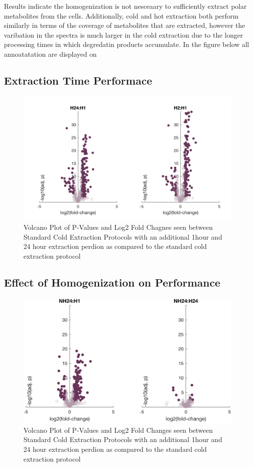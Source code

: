 \documentclass[a4paper]{article}
\begin{document}
Results indicate the homogenization is not nesceaary to sufficiently extract polar metabolites from the cells. Additionally, cold and hot extraction both perform similarly in terms of the coverage of metabolites that are extracted, however the varibation in the spectra is much larger in the cold extraction due to the longer processing times in which degredatin products accumulate. In the figure below all annoatatation are displayed on 

\subsection{Extraction Time Performace}
\begin{figure}[H]
	\centering
	\includegraphics[width=0.7\linewidth]{H1-H24-H2-01}
	\caption{Volcano Plot of P-Values and Log2 Fold Chagnes seen between Standard Cold Extraction Protocols with an additional 1hour and 24 hour extraction perdion as compared to the standard cold extraction protocol}
	\label{fig:h1-h24-h2-01}
\end{figure}

\subsection{Effect of Homogenization on Performance}
\begin{figure}[H]
	\centering
	\includegraphics[width=0.7\linewidth]{NH24}
	\caption{Volcano Plot of P-Values and Log2 Fold Changes seen between Standard Cold Extraction Protocols with an additional 1hour and 24 hour extraction perdion as compared to the standard cold extraction protocol}
	\label{fig:nh24}
\end{figure}
\end{document}
